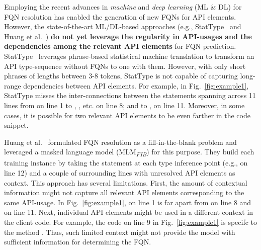 Employing the recent advances in {\em machine} and {\em deep learning} (ML \& DL) for FQN resolution has enabled the generation of new FQNs for API elements. However, the state-of-the-art ML/DL-based approaches (e.g., StatType~\cite{icse18} and Huang et al.~\cite{prompt-ase22}) {\bf do not yet leverage the regularity in API-usages and the dependencies among the relevant API elements} for FQN prediction. StatType~\cite{icse18} leverages phrase-based statistical machine translation to transform an API type-sequence without FQNs to one with them. However, with only short phrases of lengths between 3-8 tokens, StatType is not capable of capturing long-range dependencies between API elements. For example, in Fig.~\ref{fig:example1}, StatType misses the inter-connections between the statements spanning across 11 lines from  on line 1 to , , etc. on line 8; and to ,  on line 11. Moreover, in some cases, it is possible for two relevant API elements to be even farther in the code snippet.

Huang et al.~\cite{prompt-ase22} formulated FQN resolution as a fill-in-the-blank problem and leveraged a masked language model (MLM\textsubscript{\textit{FIB}}) for this purpose. They build each training instance by taking the statement at each type inference point (e.g.,  on line 12) and a couple of surrounding lines with unresolved API elements as context. This approach has several limitations. First, the amount of contextual information might not capture all relevant API elements corresponding to the same API-usage. In Fig.~\ref{fig:example1},  on line 1 is far apart from  on line 8 and  on line 11. Next, individual API elements might be used in a different context in the client code. For example, the code on line 9 in Fig.~\ref{fig:example1} is specifc to the method . Thus, such limited context might not provide the model with sufficient information for determining the FQN.


